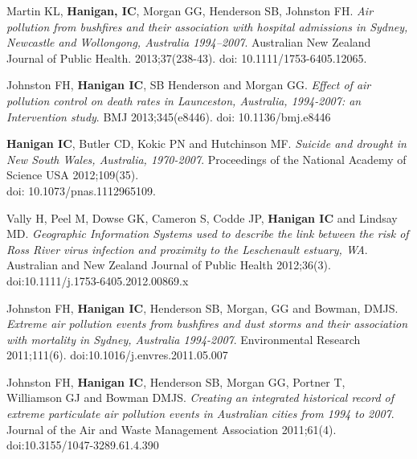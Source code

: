 \documentclass[a4paper,11pt]{article}
\begin{document}
\renewcommand{\labelenumi}{\textsc{a}\theenumi.}
\begin{revnumerate}

\item Martin KL, \textbf{Hanigan, IC}, Morgan GG, Henderson SB, Johnston FH. \emph{Air pollution from bushfires and their association with hospital admissions in Sydney, Newcastle and Wollongong, Australia 1994–2007}. Australian New Zealand Journal of Public Health. 2013;37(238-43). doi: 10.1111/1753-6405.12065.


\item Johnston FH, \textbf{Hanigan IC}, SB Henderson and Morgan GG. \emph{Effect of air pollution control on death rates in Launceston, Australia, 1994-2007: an Intervention study}.  BMJ 2013;345(e8446). doi: 10.1136/bmj.e8446

\item \textbf{Hanigan IC}, Butler CD, Kokic PN and Hutchinson MF. \emph{Suicide and drought in New South Wales, Australia, 1970-2007}.  Proceedings of the National Academy of Science USA 2012;109(35).\\
doi: 10.1073/pnas.1112965109.

\item  Vally H, Peel M, Dowse GK, Cameron S, Codde JP, \textbf{Hanigan IC} and Lindsay MD. \emph{Geographic Information Systems used to describe the link between the risk of Ross River virus infection and proximity to the Leschenault estuary, WA}. Australian and New Zealand Journal of Public Health 2012;36(3). doi:10.1111/j.1753-6405.2012.00869.x

\item Johnston FH, \textbf{Hanigan IC}, Henderson SB, Morgan, GG and Bowman, DMJS. \emph{Extreme air pollution events from bushfires and dust storms and their association with mortality in Sydney, Australia 1994-2007}.  Environmental Research 2011;111(6). doi:10.1016/j.envres.2011.05.007

\item Johnston FH, \textbf{Hanigan IC}, Henderson SB, Morgan GG, Portner T, \\
 Williamson GJ and Bowman DMJS. \emph{Creating an integrated historical record of extreme particulate air pollution events in Australian cities from 1994 to 2007}. Journal of the Air and Waste Management Association 2011;61(4). doi:10.3155/1047-3289.61.4.390


\end{revnumerate}
\end{document}
